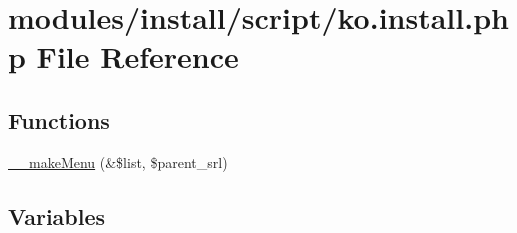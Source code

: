 \hypertarget{ko_8install_8php}{}\section{modules/install/script/ko.install.\+php File Reference}
\label{ko_8install_8php}
\subsection*{Functions}
\begin{DoxyCompactItemize}
\item 
\hyperlink{ko_8install_8php_ad60c2cd76a2ed990ddee173225120808}{\+\_\+\+\_\+make\+Menu} (\&\$list, \$parent\+\_\+srl)
\end{DoxyCompactItemize}
\subsection*{Variables}
